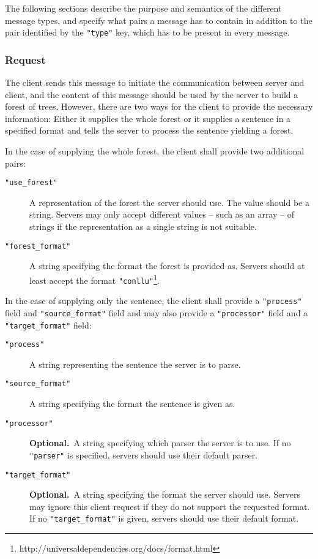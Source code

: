 \documentclass{scrartcl}
\newcommand{\jsstring}[1]{\texttt{\color{OrangeRed}"#1"}}
\newcommand{\optional}{\textbf{Optional.}}
\begin{document}
The following sections describe the purpose and semantics of the different message types,
and specify what pairs a message has to contain in addition to the pair identified by the \jsstring{type} key,
which has to be present in every message.

\subsubsection{Request}
\label{ssub:Request}

The client sends this message to initiate the communication between server and client,
and the content of this message should be used by the server to build a forest of trees.
However, there are two ways for the client to provide the necessary information:
Either it supplies the whole forest or it supplies a sentence in a specified format and tells the server to process the sentence yielding a forest.

In the case of supplying the whole forest, the client shall provide two additional pairs:
\begin{description}
    \item[\jsstring{use\_forest}] A representation of the forest the server should use.
        The value should be a string.
        Servers may only accept different values – such as an array – of strings if the representation as a single string is not suitable.
    \item[\jsstring{forest\_format}] A string specifying the format the forest is provided as.
        Servers should at least accept the format \jsstring{conllu}\footnote{http://universaldependencies.org/docs/format.html}.
\end{description}
In the case of supplying only the sentence, the client shall provide a \jsstring{process} field and \jsstring{source\_format} field and may also provide a \jsstring{processor} field and a \jsstring{target\_format} field:
\begin{description}
    \item[\jsstring{process}] A string representing the sentence the server is to parse.
    \item[\jsstring{source\_format}] A string specifying the format the sentence is given as.
    \item[\jsstring{processor}] \optional\ A string specifying which parser the server is to use.
        If no \jsstring{parser} is specified, servers should use their default parser.
    \item[\jsstring{target\_format}] \optional\ A string specifying the format the server should use.
        Servers may ignore this client request if they do not support the requested format.
        If no \jsstring{target\_format} is given, servers should use their default format.
\end{description}
\end{document}
